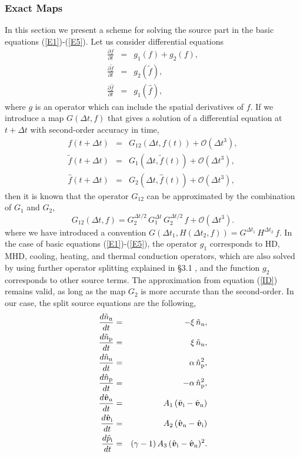 \documentclass[12pt,preprint]{aastex}
\newcommand{\bvel}{\boldmath\mbox{$v$}\unboldmath}
\begin{document}
\subsubsection{Exact Maps}
In this section we present a scheme for solving the source part in the basic equations (\ref{E1})-(\ref{E5}).
Let us consider differential equations
\begin{eqnarray}
\frac{\partial f}{\partial t}&=&g_{1}(f)+g_{2}(f),\\
\frac{\partial \tilde{f}}{\partial t}&=&g_{2}(\tilde{f}),\\
\frac{\partial \hat{f}}{\partial t}&=&g_{1}(\hat{f}),
\end{eqnarray}
where $g$ is an operator which can include the spatial derivatives of $f$.
If we introduce a map $G(\Delta t, f)$ that gives a solution of a differential equation at $t+\Delta t$ with second-order accuracy in time, 
\begin{eqnarray}
f(t+\Delta t)&=&G_{12}(\Delta t, f(t))+\mathcal{O}(\Delta t^{3}),\\
\tilde{f}(t+\Delta t)&=&G_{1}(\Delta t, \tilde{f}(t))+\mathcal{O}(\Delta t^{3}),\\
\hat{f}(t+\Delta t)&=&G_{2}(\Delta t, \hat{f}(t))+\mathcal{O}(\Delta t^{3}),
\end{eqnarray}
then it is known that 
the operator $G_{12}$ can be approximated by 
the combination of $G_{1}$ and $G_{2}$,
\begin{equation}\label{ID}
G_{12}(\Delta t,f)=G_{2}^{\Delta t/2}\,G_{1}^{\Delta t}\,G_{2}^{\Delta t/2}\,f+\mathcal{O}(\Delta t^{3}).
\end{equation}
where we have introduced a convention $G(\Delta t_{1},H(\Delta t_{2},f))=G^{\Delta t_{1}}\,H^{\Delta t_{2}}\,f$.
In the case of basic equations (\ref{E1})-(\ref{E5}), the operator $g_{1}$ corresponds to HD, MHD, cooling, heating, and thermal conduction operators, which are also solved by using further operator splitting explained in \S3.1 , and the function $g_{2}$ corresponds to other source terms.
The approximation from equation (\ref{ID}) remains valid,  as long as the map $G_{2}$ is more accurate than the second-order. 
In our case, the split source equations are the following,
\begin{eqnarray}
\frac{d\tilde{n}_{\rm n}}{dt}&=&-\xi\,\tilde{n}_{\rm n},\\
\frac{d\tilde{n}_{\rm p}}{dt}&=&\xi\,\tilde{n}_{\rm n},\\
\frac{d\hat{n}_{\rm n}}{dt}&=&\alpha\,\hat{n}_{\rm p}^{2},\\
\frac{d\hat{n}_{\rm p}}{dt}&=&-\alpha\,\hat{n}_{\rm p}^{2},\\
\frac{d\hat{\bvel}_{\rm n}}{dt}&=&A_{1}\,(\hat{\bvel}_{\rm i}-\hat{\bvel}_{\rm n})\\
\frac{d\hat{\bvel}_{\rm i}}{dt}&=&A_{2}\,(\hat{\bvel}_{\rm n}-\hat{\bvel}_{\rm i})\\
\frac{d\hat{p}_{\rm i}}{dt}&=& (\gamma-1)\,A_{3}\,(\hat{\bvel}_{\rm i}-\hat{\bvel}_{\rm n})^{2}.
\end{eqnarray}
\end{document}
